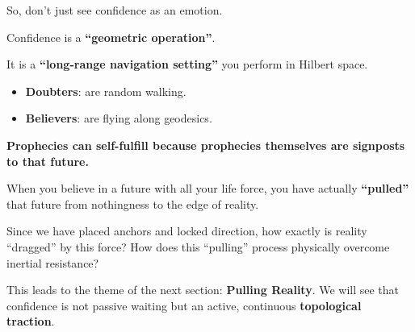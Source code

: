 So, don't just see confidence as an emotion.

Confidence is a \textbf{``geometric operation''}.

It is a \textbf{``long-range navigation setting''} you perform in Hilbert space.

\begin{itemize}
\item \textbf{Doubters}: are random walking.

\item \textbf{Believers}: are flying along geodesics.
\end{itemize}

\textbf{Prophecies can self-fulfill because prophecies themselves are signposts to that future.}

When you believe in a future with all your life force, you have actually \textbf{``pulled''} that future from nothingness to the edge of reality.

Since we have placed anchors and locked direction, how exactly is reality ``dragged'' by this force? How does this ``pulling'' process physically overcome inertial resistance?

This leads to the theme of the next section: \textbf{Pulling Reality}. We will see that confidence is not passive waiting but an active, continuous \textbf{topological traction}.

